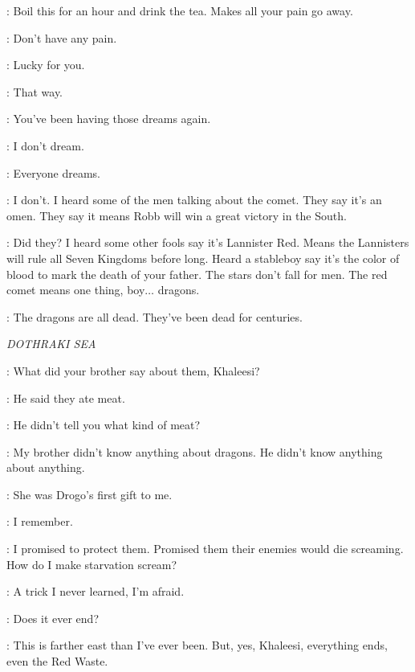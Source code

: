 
\OSHA:  Boil this for an hour and drink the tea. Makes all your pain go away.

\BRAN: Don't have any pain.

\OSHA: Lucky for you.

\BRAN:  That way.

\OSHA: You've been having those dreams again.

\BRAN: I don't dream.

\OSHA: Everyone dreams.

\BRAN: I don't. I heard some of the men talking about the comet. They say it's an omen. They say it means Robb will win a great victory in the South.

\OSHA: Did they? I heard some other fools say it's Lannister Red. Means the Lannisters will rule all Seven Kingdoms before long. Heard a stableboy say it's the color of blood to mark the death of your father. The stars don't fall for men. The red comet means one thing, boy$\ldots$ dragons.

\BRAN: The dragons are all dead. They've been dead for centuries.


\scene

\textit{DOTHRAKI SEA}


\DOREAH: What did your brother say about them, Khaleesi?

\DAENERYS: He said they ate meat.

\DOREAH: He didn't tell you what kind of meat?

\DAENERYS: My brother didn't know anything about dragons. He didn't know anything about anything.


\DAENERYS: She was Drogo's first gift to me.

\JORAH: I remember.

\DAENERYS: I promised to protect them. Promised them their enemies would die screaming. How do I make starvation scream?

\JORAH: A trick I never learned, I'm afraid.

\DAENERYS: Does it ever end?

\JORAH: This is farther east than I've ever been. But, yes, Khaleesi, everything ends, even the Red Waste.

